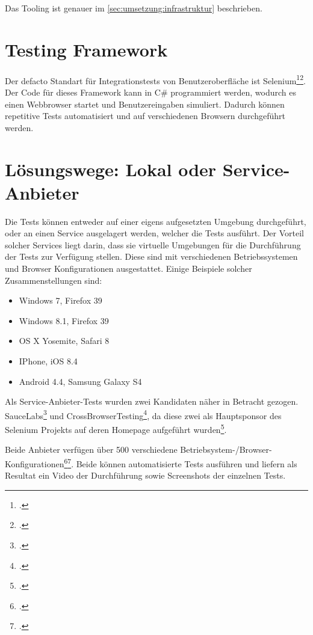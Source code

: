Das Tooling ist genauer im \cref{sec:umsetzung:infrastruktur}  beschrieben.

\section{Testing Framework}
\label{sec:Recherche:TestingFrameworks}
Der defacto Standart für Integrationstests von Benutzeroberfläche ist Selenium\footcite{Selenium_-_Web_Browser_Automation_2015-07-26}\footcite{Happy_10th_Birthday_Selenium_ThoughtWorks_2015-07-26}. Der Code für dieses Framework kann in C\# programmiert werden, wodurch es einen Webbrowser startet und Benutzereingaben simuliert. Dadurch können repetitive Tests automatisiert und auf verschiedenen Browsern durchgeführt werden.

\section{Lösungswege: Lokal oder Service-Anbieter}
\label{sec:Recherche:loesungswege}
Die Tests können entweder auf einer eigens aufgesetzten Umgebung durchgeführt, oder an einen Service ausgelagert werden, welcher die Tests ausführt. 
Der Vorteil solcher Services liegt darin, dass sie virtuelle Umgebungen für die Durchführung der Tests zur Verfügung stellen. Diese sind mit verschiedenen Betriebssystemen und Browser Konfigurationen ausgestattet. Einige Beispiele solcher Zusammenstellungen sind:
\begin{itemize}
\item Windows 7, Firefox 39
\item Windows 8.1, Firefox 39
\item OS X Yosemite, Safari 8
\item IPhone, iOS 8.4
\item Android 4.4, Samsung Galaxy S4
\end{itemize}

Als Service-Anbieter-Tests wurden zwei Kandidaten näher in Betracht gezogen. SauceLabs\footcite{Sauce_Labs_2015-07-26} und CrossBrowserTesting\footcite{Cross_Browser_Testing_2015-07-26}, da diese zwei als Hauptsponsor des Selenium Projekts auf deren Homepage aufgeführt wurden\footcite{Seleniumhq}.

Beide Anbieter verfügen über 500 verschiedene Betriebsystem-/Browser-Konfigurationen\footcite{Platforms_2015-07-26}\footcite{OS_Browser_Configurations_for_Cross_Browser_Compatibility_Testing_2015-07-26}. Beide können automatisierte Tests ausführen und liefern als Resultat ein Video der Durchführung sowie Screenshots der einzelnen Tests.

